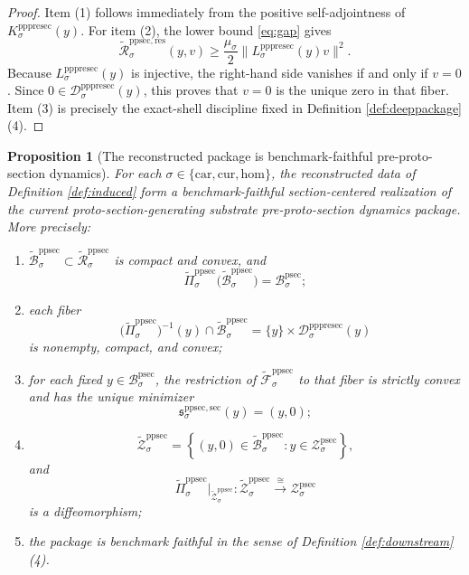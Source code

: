 \documentclass[11pt]{article}
\newcommand{\Car}{\mathrm{car}}
\newcommand{\Cur}{\mathrm{cur}}
\newcommand{\Hom}{\mathrm{hom}}
\newcommand{\ProtoSectionBody}[1]{\mathcal B_{#1}^{\mathrm{psec}}}
\newcommand{\ProtoSectionShell}[1]{\mathcal Z_{#1}^{\mathrm{psec}}}
\newcommand{\PreProtoSectionMinSection}[1]{\mathfrak s_{#1}^{\mathrm{ppsec,sec}}}
\newcommand{\PrePreProtoSectionResidualBody}[1]{\mathcal D_{#1}^{\mathrm{pppresec}}}
\newcommand{\PrePreProtoSectionResponseMap}[1]{L_{#1}^{\mathrm{pppresec}}}
\newcommand{\PrePreProtoSectionOperator}[1]{K_{#1}^{\mathrm{pppresec}}}
\newcommand{\InducedResidualFunctional}[1]{\widetilde{\mathscr R}_{#1}^{\mathrm{ppsec,res}}}
\newcommand{\InducedPreProtoSectionState}[1]{\widetilde{\mathcal R}_{#1}^{\mathrm{ppsec}}}
\newcommand{\InducedPreProtoSectionBody}[1]{\widetilde{\mathcal B}_{#1}^{\mathrm{ppsec}}}
\newcommand{\InducedPreProtoSectionProj}[1]{\widetilde{\Pi}_{#1}^{\mathrm{ppsec}}}
\newcommand{\InducedPreProtoSectionFunctional}[1]{\widetilde{\mathscr F}_{#1}^{\mathrm{ppsec}}}
\newcommand{\InducedPreProtoSectionShell}[1]{\widetilde{\mathcal Z}_{#1}^{\mathrm{ppsec}}}
\newtheorem{proposition}{Proposition}
\begin{document}
\begin{proof}
Item (1) follows immediately from the positive self-adjointness of \(\PrePreProtoSectionOperator{\sigma}(y)\). For item (2), the lower bound \eqref{eq:gap} gives
\[
\InducedResidualFunctional{\sigma}(y,v)
\ge
\frac{\mu_{\sigma}}{2}
\bigl\|
\PrePreProtoSectionResponseMap{\sigma}(y)v
\bigr\|^{2}.
\]
Because \(\PrePreProtoSectionResponseMap{\sigma}(y)\) is injective, the right-hand side vanishes if and only if \(v=0\). Since \(0\in\PrePreProtoSectionResidualBody{\sigma}(y)\), this proves that \(v=0\) is the unique zero in that fiber. Item (3) is precisely the exact-shell discipline fixed in Definition \ref{def:deeppackage}(4).
\end{proof}

\begin{proposition}[The reconstructed package is benchmark-faithful pre-proto-section dynamics]
\label{prop:package}
For each \(\sigma\in\{\Car,\Cur,\Hom\}\), the reconstructed data of Definition \ref{def:induced} form a benchmark-faithful section-centered realization of the current proto-section-generating substrate pre-proto-section dynamics package. More precisely:
\begin{enumerate}
    \item \(\InducedPreProtoSectionBody{\sigma}\subset\InducedPreProtoSectionState{\sigma}\) is compact and convex, and
    \[
    \InducedPreProtoSectionProj{\sigma}\bigl(\InducedPreProtoSectionBody{\sigma}\bigr)
    =
    \ProtoSectionBody{\sigma};
    \]
    \item each fiber
    \[
    \bigl(\InducedPreProtoSectionProj{\sigma}\bigr)^{-1}(y)
    \cap
    \InducedPreProtoSectionBody{\sigma}
    =
    \{y\}\times\PrePreProtoSectionResidualBody{\sigma}(y)
    \]
    is nonempty, compact, and convex;
    \item for each fixed \(y\in\ProtoSectionBody{\sigma}\), the restriction of
    \(\InducedPreProtoSectionFunctional{\sigma}\) to that fiber is strictly convex and has the unique minimizer
    \[
    \PreProtoSectionMinSection{\sigma}(y)=(y,0);
    \]
    \item
    \[
    \InducedPreProtoSectionShell{\sigma}
    =
    \left\{
    (y,0)\in\InducedPreProtoSectionBody{\sigma}:y\in\ProtoSectionShell{\sigma}
    \right\},
    \]
    and
    \[
    \InducedPreProtoSectionProj{\sigma}\big|_{\InducedPreProtoSectionShell{\sigma}}
    :
    \InducedPreProtoSectionShell{\sigma}
    \xrightarrow{\cong}
    \ProtoSectionShell{\sigma}
    \]
    is a diffeomorphism;
    \item the package is benchmark faithful in the sense of Definition \ref{def:downstream}(4).
\end{enumerate}
\end{proposition}
\end{document}
